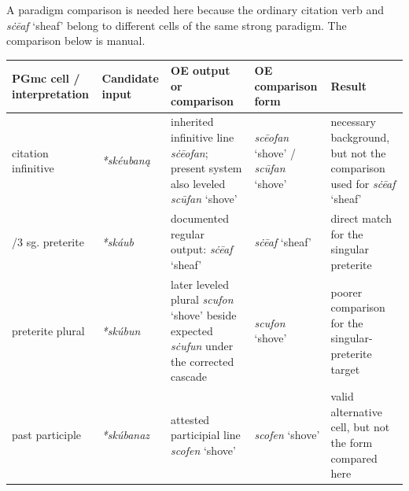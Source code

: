 \documentclass[
  british,
  a4paper,
  openany]{book}
\newcounter{none} %
\begin{document}
A paradigm comparison is needed here because the ordinary citation verb
and {\emph{sċēaf}} `sheaf' belong to different cells of the same strong
paradigm. The comparison below is manual.

{\def\LTcaptype{none} %
\begin{longtable}[]{@{}
  >{\raggedright\arraybackslash}p{}
  >{\raggedright\arraybackslash}p{}
  >{\raggedright\arraybackslash}p{}
  >{\raggedright\arraybackslash}p{}
  >{\raggedright\arraybackslash}p{}@{}}
\toprule\noalign{}
\begin{minipage}[b]{\linewidth}\raggedright
PGmc cell / interpretation
\end{minipage} & \begin{minipage}[b]{\linewidth}\raggedright
Candidate input
\end{minipage} & \begin{minipage}[b]{\linewidth}\raggedright
OE output or comparison
\end{minipage} & \begin{minipage}[b]{\linewidth}\raggedright
OE comparison form
\end{minipage} & \begin{minipage}[b]{\linewidth}\raggedright
Result
\end{minipage} \\
\midrule\noalign{}
\endhead
\bottomrule\noalign{}
\endlastfoot
citation infinitive & {\emph{*skéubaną}} & inherited infinitive line
{\emph{sċēofan}}; present system also leveled {\emph{scūfan}} `shove' &
{\emph{scēofan}} `shove' / {\emph{scūfan}} `shove' & necessary
background, but not the comparison used for {\emph{sċēaf}} `sheaf' \\
1/3 sg. preterite & {\emph{*skáub}} & documented regular output:
{\emph{sċēaf}} `sheaf' & {\emph{sċēaf}} `sheaf' & direct match for the
singular preterite \\
preterite plural & {\emph{*skúbun}} & later leveled plural
{\emph{scufon}} `shove' beside expected {\emph{sċufun}} under the
corrected cascade & {\emph{scufon}} `shove' & poorer comparison for the
singular-preterite target \\
past participle & {\emph{*skúbanaz}} & attested participial line
{\emph{scofen}} `shove' & {\emph{scofen}} `shove' & valid alternative
cell, but not the form compared here \\
\end{longtable}
}
\end{document}

